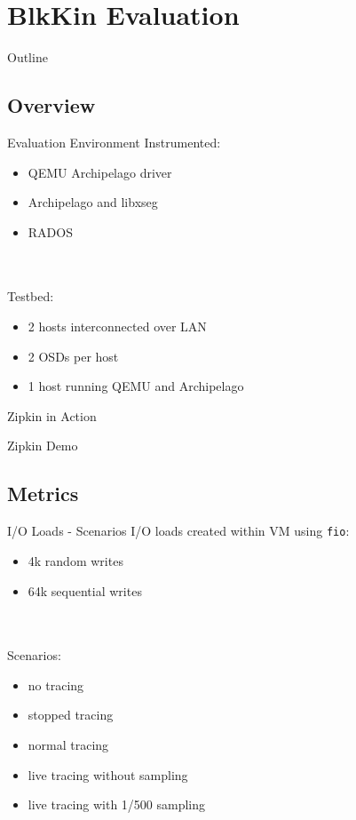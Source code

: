 \section{BlkKin Evaluation}

\begin{frame}[t]{Outline}
\setcounter{tocdepth}{1}
\tableofcontents[currentsection]
\end{frame}

\subsection{Overview}
\begin{frame}{Evaluation Environment}
Instrumented:
\begin{itemize}
\item QEMU Archipelago driver
\item Archipelago and libxseg
\item RADOS
\end{itemize}
\hfill \\
\hfill \\
Testbed:
\begin{itemize}
\item 2 hosts interconnected over LAN
\item 2 OSDs per host
\item 1 host running QEMU and Archipelago
\end{itemize}
\end{frame}

\begin{frame}{Zipkin in Action}
\hfill \\
\begin{center}
{\Large Zipkin Demo}
\end{center}
\end{frame}

\subsection{Metrics}
\begin{frame}{I/O Loads - Scenarios}
I/O loads created within VM using \texttt{fio}:
\begin{itemize}
\item 4k random writes
\item 64k sequential writes
\end{itemize}
\hfill \\
\hfill \\
Scenarios:
\begin{itemize}
\item no tracing
\item stopped tracing
\item normal tracing
\item live tracing without sampling
\item live tracing with 1/500 sampling
\end{itemize}
\end{frame}

